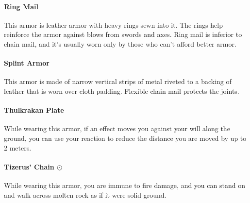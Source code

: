     \paragraph{Ring Mail}
        This armor is leather armor with heavy rings sewn into it.
        The rings help reinforce the armor against blows from swords and axes.
        Ring mail is inferior to chain mail, and it's usually worn only by those who can't afford better armor.
    \paragraph{Splint Armor}
        This armor is made of narrow vertical strips of metal riveted to a backing of leather that is worn over cloth padding.
        Flexible chain mail protects the joints.
    \paragraph{Thulkrakan Plate}
        While wearing this armor, if an effect moves you against your will along the ground, you can use your reaction to reduce the distance you are moved by up to 2 meters.
    \paragraph{Tizerus' Chain $\odot$}
        While wearing this armor, you are immune to fire damage, and you can stand on and walk across molten rock as if it were solid ground.
